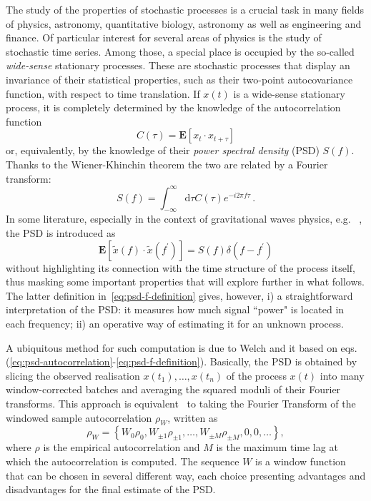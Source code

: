 \documentclass[twocolumn,showpacs,preprintnumbers,nofootinbib,prd,
superscriptaddress,10pt]{revtex4-1}
\begin{document}
The study of the properties of stochastic processes is a crucial task in many fields of physics, astronomy, quantitative biology, astronomy as well as engineering and finance. Of particular interest for several areas of physics is the study of stochastic time series. Among those, a special place is occupied by the so-called \textit{wide-sense} stationary processes. These are stochastic processes that display an invariance of their statistical properties, such as their two-point autocovariance function, with respect to time translation. If $x(t)$ is a wide-sense stationary process, it is completely determined by the knowledge of the autocorrelation function 
\begin{equation}
	C(\tau) = \mathbf{E}[x_t \cdot x_{t+\tau}]
\end{equation}
or, equivalently, by the knowledge of their \emph{power spectral density} (PSD) $S(f)$. Thanks to the Wiener-Khinchin theorem the two are related by a Fourier transform: 
\begin{equation}\label{eq:psd-autocorrelation}
	S(f) = \int_{-\infty}^{\infty} \textrm{d}\tau C(\tau) e^{-i 2 \pi f \tau}\,.
\end{equation}
In some literature, especially in the context of gravitational waves physics, e.g. ~\cite{Finn_1992}, the PSD is introduced as  
\begin{equation}\label{eq:psd-f-definition}
	\mathbf{E}[\tilde{x}(f) \cdot \tilde{x}(f^\prime)] = S(f) \delta(f-f^\prime)
\end{equation}
without highlighting its connection with the time structure of the process itself, thus masking some important properties that will explore further in what follows. The latter definition in~\eqref{eq:psd-f-definition} gives, however, i) a straightforward interpretation of the PSD: it measures how much signal ``power" is located in each frequency; ii) an operative way of estimating it for an unknown process.  

A ubiquitous method for such computation is due to Welch \cite{Welch1967} and it based on eqs.(\ref{eq:psd-autocorrelation}-\ref{eq:psd-f-definition}).
Basically, the PSD is obtained by slicing the observed realisation $x(t_1),\ldots,x(t_n)$ of the process $x(t)$ into many window-corrected batches and averaging the squared moduli of their Fourier transforms.
This approach is equivalent~\cite{Lomb,Scargle} to taking the Fourier Transform of the windowed sample autocorrelation $\rho_W$, written as
\begin{equation}
    \rho_{W} = \left\{W_0\rho_0,W_{\pm 1}\rho_{\pm 1}, \dots, W_{\pm M}\rho_{\pm M}, 0, 0, \dots \right\},
\end{equation}
where $\rho$ is the empirical autocorrelation and $M$ is the maximum time lag at which the autocorrelation is computed.
The sequence $W$ is a window function that can be chosen in several different way, each choice presenting advantages and disadvantages for the final estimate of the PSD.
\end{document}
